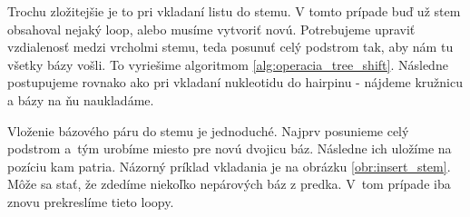 Trochu zložitejšie je to pri vkladaní listu do stemu. V tomto prípade buď už stem
obsahoval nejaký loop, alebo musíme vytvoriť novú. Potrebujeme upraviť vzdialenosť
medzi vrcholmi stemu, teda posunuť celý podstrom tak, aby nám tu všetky bázy vošli.
To vyriešime algoritmom \ref{alg:operacia_tree_shift}. Následne postupujeme
rovnako ako pri vkladaní nukleotidu do hairpinu - nájdeme kružnicu a bázy
na ňu naukladáme.

Vloženie bázového páru do stemu je jednoduché. Najprv posunieme celý podstrom
a~tým urobíme miesto pre novú dvojicu báz. Následne ich uložíme na pozíciu kam patria.
Názorný príklad vkladania je na obrázku \ref{obr:insert_stem}.
Môže sa stať, že zdedíme niekoľko nepárových báz z predka. V~tom prípade iba
znovu prekreslíme tieto loopy.


\renewcommand{\wi}{0.45\textwidth}

